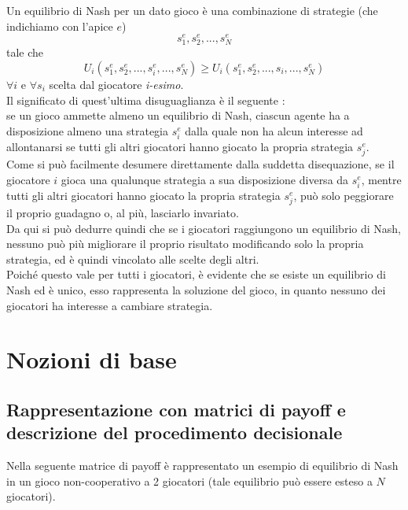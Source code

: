 Un equilibrio di Nash per un dato gioco è una combinazione di strategie (che indichiamo con l'apice \(e\))
\[s_{1}^{e},s_{2}^{e},...,s_{N}^{e}\]
tale che
\[U_{i}\left(s_{1}^{e},s_{2}^{e},...,s_{i}^{e},...,s_{N}^{e}\right)\geq U_{i}\left(s_{1}^{e},s_{2}^{e},...,s_{i},...,s_{N}^{e}\right)\]
\(\forall i\) e \(\forall s_i\) scelta dal giocatore \textit{i-esimo}.\\

Il significato di quest'ultima disuguaglianza è il seguente : \\
se un gioco ammette almeno un equilibrio di Nash, ciascun agente ha a disposizione almeno una strategia \(s_i^e\) dalla quale non ha alcun interesse ad allontanarsi se tutti gli altri giocatori hanno giocato la propria strategia \(s_j^e\).\\

Come si può facilmente desumere direttamente dalla suddetta disequazione, se il giocatore \(i\) gioca una qualunque strategia a sua disposizione diversa da \(s_i^e\), mentre tutti gli altri giocatori hanno giocato la propria strategia \(s_j^e\), può solo peggiorare il proprio guadagno o, al più, lasciarlo invariato.\\

Da qui si può dedurre quindi che se i giocatori raggiungono un equilibrio di Nash, nessuno può più migliorare il proprio risultato modificando solo la propria strategia, ed è quindi vincolato alle scelte degli altri.\\

Poiché questo vale per tutti i giocatori, è evidente che se esiste un equilibrio di Nash ed è unico, esso rappresenta la soluzione del gioco, in quanto nessuno dei giocatori ha interesse a cambiare strategia.\\

\section{Nozioni di base}

\subsection{Rappresentazione con matrici di payoff e descrizione del procedimento decisionale}
\justify
Nella seguente matrice di payoff è rappresentato un esempio di equilibrio di Nash in un gioco non-cooperativo a 2 giocatori (tale equilibrio può essere esteso a \(N\) giocatori).\\


